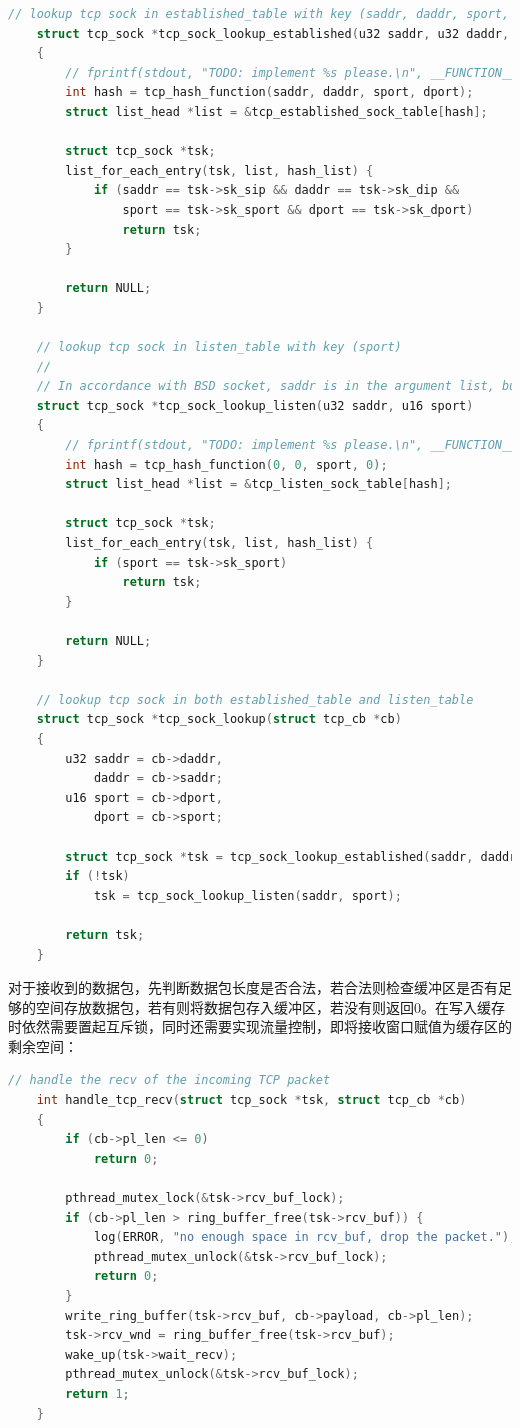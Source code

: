 \documentclass[UTF8]{report}
\begin{document}
\begin{lstlisting}[language=C]
    // lookup tcp sock in established_table with key (saddr, daddr, sport, dport)
    struct tcp_sock *tcp_sock_lookup_established(u32 saddr, u32 daddr, u16 sport, u16 dport)
    {
        // fprintf(stdout, "TODO: implement %s please.\n", __FUNCTION__);
        int hash = tcp_hash_function(saddr, daddr, sport, dport);
        struct list_head *list = &tcp_established_sock_table[hash];
    
        struct tcp_sock *tsk;
        list_for_each_entry(tsk, list, hash_list) {
            if (saddr == tsk->sk_sip && daddr == tsk->sk_dip &&
                sport == tsk->sk_sport && dport == tsk->sk_dport)
                return tsk;
        }
    
        return NULL;
    }
    
    // lookup tcp sock in listen_table with key (sport)
    //
    // In accordance with BSD socket, saddr is in the argument list, but never used.
    struct tcp_sock *tcp_sock_lookup_listen(u32 saddr, u16 sport)
    {
        // fprintf(stdout, "TODO: implement %s please.\n", __FUNCTION__);
        int hash = tcp_hash_function(0, 0, sport, 0);
        struct list_head *list = &tcp_listen_sock_table[hash];
    
        struct tcp_sock *tsk;
        list_for_each_entry(tsk, list, hash_list) {
            if (sport == tsk->sk_sport)
                return tsk;
        }
    
        return NULL;
    }
    
    // lookup tcp sock in both established_table and listen_table
    struct tcp_sock *tcp_sock_lookup(struct tcp_cb *cb)
    {
        u32 saddr = cb->daddr,
            daddr = cb->saddr;
        u16 sport = cb->dport,
            dport = cb->sport;
    
        struct tcp_sock *tsk = tcp_sock_lookup_established(saddr, daddr, sport, dport);
        if (!tsk)
            tsk = tcp_sock_lookup_listen(saddr, sport);
    
        return tsk;
    }
\end{lstlisting}

对于接收到的数据包，先判断数据包长度是否合法，若合法则检查缓冲区是否有足够的空间存放数据包，若有则将数据包存入缓冲区，若没有则返回0。在写入缓存时依然需要置起互斥锁，同时还需要实现流量控制，即将接收窗口赋值为缓存区的剩余空间：

\begin{lstlisting}[language=C]
    // handle the recv of the incoming TCP packet
    int handle_tcp_recv(struct tcp_sock *tsk, struct tcp_cb *cb)
    {
        if (cb->pl_len <= 0)
            return 0;
        
        pthread_mutex_lock(&tsk->rcv_buf_lock);
        if (cb->pl_len > ring_buffer_free(tsk->rcv_buf)) {
            log(ERROR, "no enough space in rcv_buf, drop the packet.");
            pthread_mutex_unlock(&tsk->rcv_buf_lock);
            return 0;
        }
        write_ring_buffer(tsk->rcv_buf, cb->payload, cb->pl_len);
        tsk->rcv_wnd = ring_buffer_free(tsk->rcv_buf);
        wake_up(tsk->wait_recv);
        pthread_mutex_unlock(&tsk->rcv_buf_lock);
        return 1;
    }
\end{lstlisting}
\end{document}
